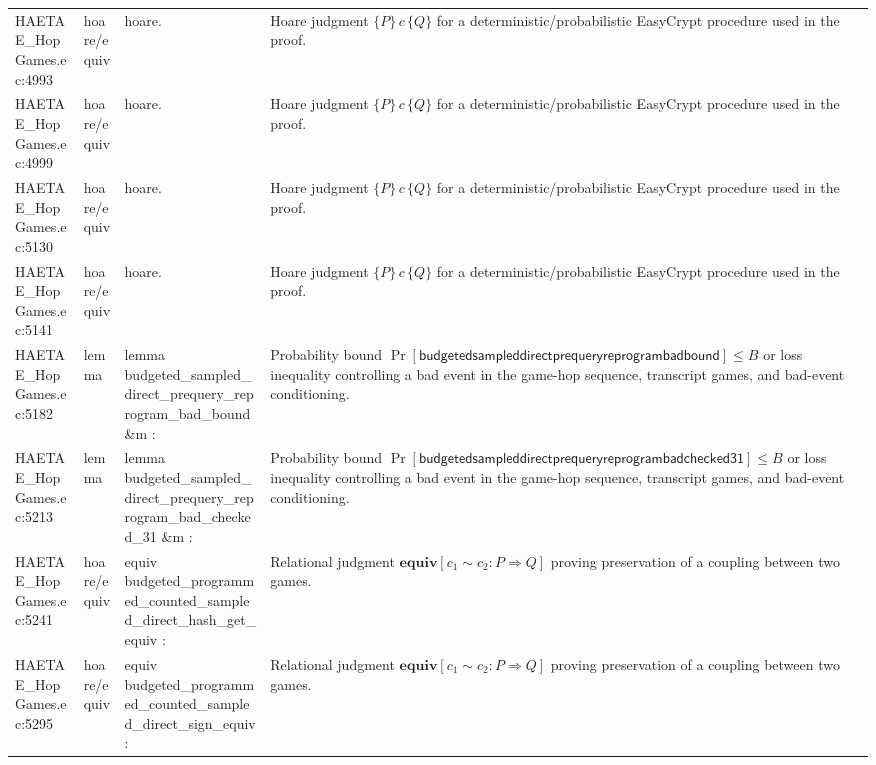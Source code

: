 \documentclass[10pt]{article}
\begin{document}
\begin{longtable}{L{0.11\textwidth}L{0.055\textwidth}L{0.385\textwidth}L{0.41\textwidth}}
HAETAE\_\allowbreak{}HopGames.\allowbreak{}ec:\allowbreak{}4993 & hoare/equiv & {\ttfamily\scriptsize hoare.} & Hoare judgment $\{P\}\,c\,\{Q\}$ for a deterministic/probabilistic EasyCrypt procedure used in the proof. \\
HAETAE\_\allowbreak{}HopGames.\allowbreak{}ec:\allowbreak{}4999 & hoare/equiv & {\ttfamily\scriptsize hoare.} & Hoare judgment $\{P\}\,c\,\{Q\}$ for a deterministic/probabilistic EasyCrypt procedure used in the proof. \\
HAETAE\_\allowbreak{}HopGames.\allowbreak{}ec:\allowbreak{}5130 & hoare/equiv & {\ttfamily\scriptsize hoare.} & Hoare judgment $\{P\}\,c\,\{Q\}$ for a deterministic/probabilistic EasyCrypt procedure used in the proof. \\
HAETAE\_\allowbreak{}HopGames.\allowbreak{}ec:\allowbreak{}5141 & hoare/equiv & {\ttfamily\scriptsize hoare.} & Hoare judgment $\{P\}\,c\,\{Q\}$ for a deterministic/probabilistic EasyCrypt procedure used in the proof. \\
HAETAE\_\allowbreak{}HopGames.\allowbreak{}ec:\allowbreak{}5182 & lemma & {\ttfamily\scriptsize lemma budgeted\_\allowbreak{}sampled\_\allowbreak{}direct\_\allowbreak{}prequery\_\allowbreak{}reprogram\_\allowbreak{}bad\_\allowbreak{}bound \&m :} & Probability bound $\Pr[\mathsf{budgetedsampleddirectprequeryreprogrambadbound}]\le B$ or loss inequality controlling a bad event in the game-hop sequence, transcript games, and bad-event conditioning. \\
HAETAE\_\allowbreak{}HopGames.\allowbreak{}ec:\allowbreak{}5213 & lemma & {\ttfamily\scriptsize lemma budgeted\_\allowbreak{}sampled\_\allowbreak{}direct\_\allowbreak{}prequery\_\allowbreak{}reprogram\_\allowbreak{}bad\_\allowbreak{}checked\_\allowbreak{}31 \&m :} & Probability bound $\Pr[\mathsf{budgetedsampleddirectprequeryreprogrambadchecked31}]\le B$ or loss inequality controlling a bad event in the game-hop sequence, transcript games, and bad-event conditioning. \\
HAETAE\_\allowbreak{}HopGames.\allowbreak{}ec:\allowbreak{}5241 & hoare/equiv & {\ttfamily\scriptsize equiv budgeted\_\allowbreak{}programmed\_\allowbreak{}counted\_\allowbreak{}sampled\_\allowbreak{}direct\_\allowbreak{}hash\_\allowbreak{}get\_\allowbreak{}equiv :} & Relational judgment $\mathbf{equiv}[c_1\sim c_2:P\Rightarrow Q]$ proving preservation of a coupling between two games. \\
HAETAE\_\allowbreak{}HopGames.\allowbreak{}ec:\allowbreak{}5295 & hoare/equiv & {\ttfamily\scriptsize equiv budgeted\_\allowbreak{}programmed\_\allowbreak{}counted\_\allowbreak{}sampled\_\allowbreak{}direct\_\allowbreak{}sign\_\allowbreak{}equiv :} & Relational judgment $\mathbf{equiv}[c_1\sim c_2:P\Rightarrow Q]$ proving preservation of a coupling between two games. \\

\end{longtable}
\end{document}
